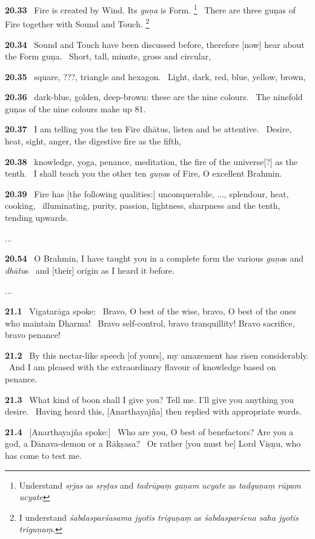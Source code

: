 \documentclass{article}
\newcommand{\skt}[1]{\textit{#1}}
\begin{document}
\textbf{20.33}%
\ Fire is created by Wind. Its \skt{guṇa} is Form.%
\footnote{Understand \skt{sṛjas} as \skt{sṛṣṭas} and \skt{tadrūpaṃ guṇam ucyate} as \skt{tadguṇaṃ rūpam ucyate} }%
\ There are three guṇas of Fire together with Sound and Touch.%
\footnote{I understand \skt{śabdasparśasama jyotis triguṇaṃ} as \skt{śabdasparśena saha jyotis triguṇaṃ}. }%


\textbf{20.34}%
\ Sound and Touch have been discussed before, therefore [now] hear about the Form guṇa.%
\ Short, tall, minute, gross and circular,%


\textbf{20.35}%
\ square, ???, triangle and hexagon.%
\ Light, dark, red, blue, yellow, brown,%


\textbf{20.36}%
\ dark-blue, golden, deep-brown: these are the nine colours.%
\ The ninefold guṇas of the nine colours make up 81.%


\textbf{20.37}%
\ I am telling you the ten Fire dhātus, listen and be attentive.%
\ Desire, heat, sight, anger, the digestive fire as the fifth,%


\textbf{20.38}%
\ knowledge, yoga, penance, meditation, the fire of the universe[?] as the tenth.%
\ I shall teach you the other ten \skt{guṇa}s of Fire, O excellent Brahmin.%


\textbf{20.39}%
\ Fire has [the following qualities:] unconquerable, ..., splendour, heat, cooking,%
\                         illuminating, purity, passion, lightness, sharpness and the tenth, tending upwards.%


...


\textbf{20.54}%
\ O Brahmin, I have taught you in a complete form the various \skt{guṇa}s and \skt{dhātu}s%
\                         and [their] origin as I heard it before.%


...


\textbf{21.1}%
\ Vigatarāga spoke:%
\ Bravo, O best of the wise, bravo, O best of the ones who maintain Dharma!%
\ Bravo self-control, bravo tranquillity! Bravo sacrifice, bravo penance!%


\textbf{21.2}%
\ By this nectar-like speech [of yours], my amazement has risen considerably.%
\ And I am pleased with the extraordinary flavour of knowledge based on penance.%


\textbf{21.3}%
\ What kind of boon  shall I give you? Tell me. I'll give you anything you desire.%
\ Having heard this, [Anarthayajña] then replied with appropriate words.%


\textbf{21.4}%
\ [Anarthayajña spoke:]%
\ Who are you, O best of benefactors? Are you a god, a Dānava-demon or a Rākṣasa?%
\ Or rather [you must be] Lord Viṣṇu, who has come to test me.%
\end{document}
